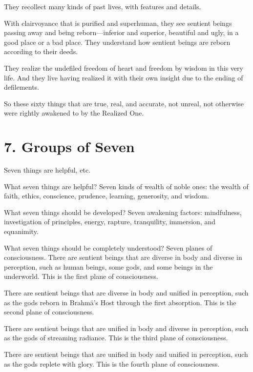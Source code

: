 \documentclass[12pt,openany]{book}%
\begin{document}
They recollect many kinds of past lives, with features and details. 

With clairvoyance that is purified and superhuman, they see sentient beings passing away and being reborn—inferior and superior, beautiful and ugly, in a good place or a bad place. They understand how sentient beings are reborn according to their deeds. 

They realize the undefiled freedom of heart and freedom by wisdom in this very life. And they live having realized it with their own insight due to the ending of defilements. 

So these sixty things that are true, real, and accurate, not unreal, not otherwise were rightly awakened to by the Realized One. 

\section*{7. Groups of Seven }

Seven things are helpful, etc. 

What seven things are helpful? Seven kinds of wealth of noble ones: the wealth of faith, ethics, conscience, prudence, learning, generosity, and wisdom. 

What seven things should be developed? Seven awakening factors: mindfulness, investigation of principles, energy, rapture, tranquility, immersion, and equanimity. 

What seven things should be completely understood? Seven planes of consciousness. There are sentient beings that are diverse in body and diverse in perception, such as human beings, some gods, and some beings in the underworld. This is the first plane of consciousness. 

There are sentient beings that are diverse in body and unified in perception, such as the gods reborn in \textsanskrit{Brahmā}’s Host through the first absorption. This is the second plane of consciousness. 

There are sentient beings that are unified in body and diverse in perception, such as the gods of streaming radiance. This is the third plane of consciousness. 

There are sentient beings that are unified in body and unified in perception, such as the gods replete with glory. This is the fourth plane of consciousness. 
\end{document}
